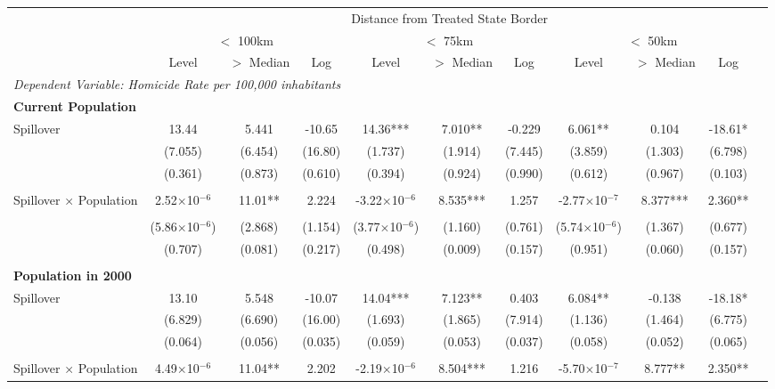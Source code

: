 \documentclass{article}
\begin{document}
\begin{table}[htbp]
\begin{adjustbox}{width=\textwidth}
\begin{tabular}{lcccccccccc}
\toprule
& \multicolumn{9}{c}{Distance from Treated State Border} \\
\cmidrule(lr){2-10}
& \multicolumn{3}{c}{$<$ 100km} & \multicolumn{3}{c}{$<$ 75km} & \multicolumn{3}{c}{$<$ 50km} \\
\cmidrule(lr){2-4} \cmidrule(lr){5-7} \cmidrule(lr){8-10}
& Level & $>$ Median & Log & Level & $>$ Median & Log & Level & $>$ Median & Log \\
\midrule
\multicolumn{10}{l}{\textit{Dependent Variable: Homicide Rate per 100,000 inhabitants}} \\[0.5em]
\multicolumn{10}{l}{\textbf{Current Population}} \\[0.5em]
Spillover & 13.44 & 5.441 & -10.65 & 14.36*** & 7.010** & -0.229 & 6.061** & 0.104 & -18.61* \\
& (7.055) & (6.454) & (16.80) & (1.737) & (1.914) & (7.445) & (3.859) & (1.303) & (6.798) \\
& (0.361) & (0.873) & (0.610) & (0.394) & (0.924) & (0.990) & (0.612) & (0.967) & (0.103) \\\\
Spillover × Population & 2.52$\times$10$^{-6}$ & 11.01** & 2.224 & -3.22$\times$10$^{-6}$ & 8.535*** & 1.257 & -2.77$\times$10$^{-7}$ & 8.377*** & 2.360** \\\\
& (5.86$\times$10$^{-6}$) & (2.868) & (1.154) & (3.77$\times$10$^{-6}$) & (1.160) & (0.761) & (5.74$\times$10$^{-6}$) & (1.367) & (0.677) \\
& (0.707) & (0.081) & (0.217) & (0.498) & (0.009) & (0.157) & (0.951) & (0.060) & (0.157) \\\\
\multicolumn{10}{l}{\textbf{Population in 2000}} \\[0.5em]
Spillover & 13.10 & 5.548 & -10.07 & 14.04*** & 7.123** & 0.403 & 6.084** & -0.138 & -18.18* \\
& (6.829) & (6.690) & (16.00) & (1.693) & (1.865) & (7.914) & (1.136) & (1.464) & (6.775) \\
& (0.064) & (0.056) & (0.035) & (0.059) & (0.053) & (0.037) & (0.058) & (0.052) & (0.065) \\\\
Spillover × Population & 4.49$\times$10$^{-6}$ & 11.04** & 2.202 & -2.19$\times$10$^{-6}$ & 8.504*** & 1.216 & -5.70$\times$10$^{-7}$ & 8.777** & 2.350** \\

\end{tabular}
\end{adjustbox}
\end{table}
\end{document}
